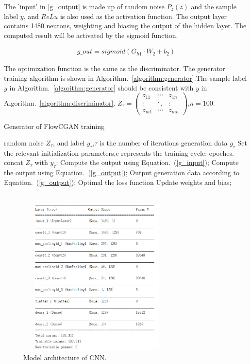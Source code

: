 \documentclass[conference]{IEEEtran}
\begin{document}
The 'input' in \eqref{g_output} is made up of random noise $P_z(z)$ and the sample label $y$, and $ReLu$ is also used as the activation function. The output layer contains 1480 neurons, weighting and biasing the output of the hidden layer. The computed result will be activated by the sigmoid function.

\begin{equation}
\begin{split}
\label{g_output}
 g\_out=sigmoid(G_{h1}\cdot W_2+b_2)
\end{split}
\end{equation}

The optimization function is the same as the discriminator. The generator training algorithm is shown in Algorithm.~\ref{algorithm:generator}.The sample label $y$ in Algorithm.~\ref{algorithm:generator} should be consistent with $y$ in Algorithm.~\ref{algorithm:discriminator}.
$Z_{\tau}=\begin{pmatrix}
z_{11}&\cdots&z_{1n}\\
\vdots&\ddots&\vdots\\
z_{m1}&\cdots&z_{mn}
\end{pmatrix}$,$n=100$.

\begin{algorithm}[htbp]
	\caption{Generator of FlowCGAN training}  \label{algorithm:generator}
	\begin{algorithmic}[1]  
		\REQUIRE random noise $Z_{\tau}$, and label $y_{\tau}$,$\tau$ is the number of iterations
		\ENSURE generation data $g_{\tau}$
		\STATE Set the relevant initialization parameters,e represents the training cycle: epoches.
		\STATE concat $Z_\tau$ with $y_\tau$: 
		\STATE Compute the output using Equation.~(\ref{g_input});
		\STATE Compute the output using Equation.~(\ref{g_output});
		\STATE Output generation data according to Equation.~(\ref{g_output});
		\STATE Optimal the loss function
		\STATE Update weights and bias;
		\ENDFOR \\ %
		\ENDFOR \\ %
	\end{algorithmic}  
\end{algorithm}  

\begin{figure}[htbp]
\centerline{\includegraphics[width=8cm, height=8cm]{fig/cnn.png}}
\caption{Model architecture of CNN.}
\label{cnn}
\end{figure}
\end{document}
